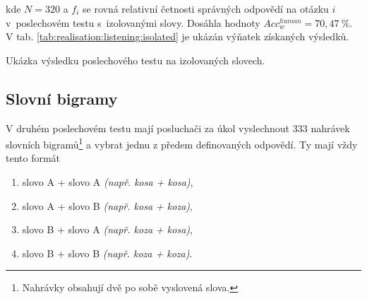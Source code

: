 \noindent kde $N=320$ a $f_i$ se rovná relativní četnosti správných odpovědí na otázku $i$ v~poslechovém testu s~izolovanými slovy. Dosáhla hodnoty $Acc_w^{human} = 70,47~\%$. V tab. \ref{tab:realisation:listening:isolated} je ukázán výňatek získaných výsledků.

\begin{table}[htpb]
  \centering
  \def\arraystretch{1.5}
  \caption{Ukázka výsledku poslechového testu na izolovaných slovech.}
  \label{tab:realisation:listening:isolated}
\end{table}

\subsection{Slovní bigramy}
\label{chap:realisation:listening:bigrams}

V druhém poslechovém testu mají posluchači za úkol vyslechnout $333$ nahrávek slovních bigramů\footnote{Nahrávky obsahují dvě po sobě vyslovená slova.} a vybrat jednu z předem definovaných odpovědí. Ty mají vždy tento formát

\begin{enumerate}[label=\alph*)]
  \item slovo A + slovo A \textit{(např. kosa + kosa)},
  \item slovo A + slovo B \textit{(např. kosa + koza)},
  \item slovo B + slovo A \textit{(např. koza + kosa)},
  \item slovo B + slovo B \textit{(např. koza + koza)}.
\end{enumerate}

